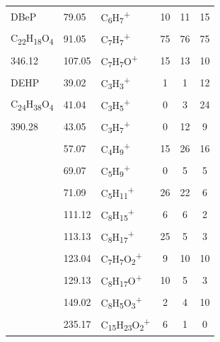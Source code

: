 {\begin{longtable}[c]{lllccc}
\hline
DBeP      & 79.05                & C\textsubscript{6}H\textsubscript{7}\textsuperscript{+}                           & 10           & 11           & 15           \\
C\textsubscript{22}H\textsubscript{18}O\textsubscript{4}          & 91.05                & C\textsubscript{7}H\textsubscript{7}\textsuperscript{+}                           & 75           & 76           & 75           \\
346.12          & 107.05               & C\textsubscript{7}H\textsubscript{7}O\textsuperscript{+}                          & 15           & 13           & 10          \\
\hline
DEHP  & 39.02  & C\textsubscript{3}H\textsubscript{3}\textsuperscript{+}                     & 1  & 1  & 12 \\
C\textsubscript{24}H\textsubscript{38}O\textsubscript{4}  & 41.04  & C\textsubscript{3}H\textsubscript{5}\textsuperscript{+}                     & 0  & 3  & 24 \\
390.28  & 43.05  & C\textsubscript{3}H\textsubscript{7}\textsuperscript{+}                     & 0  & 12 & 9  \\
 & 57.07  & C\textsubscript{4}H\textsubscript{9}\textsuperscript{+}                     & 15 & 26 & 16 \\
 & 69.07  & C\textsubscript{5}H\textsubscript{9}\textsuperscript{+}                     & 0  & 5  & 5  \\
 & 71.09  & C\textsubscript{5}H\textsubscript{11}\textsuperscript{+}                    & 26 & 22 & 6  \\
 & 111.12 & C\textsubscript{8}H\textsubscript{15}\textsuperscript{+}                    & 6  & 6  & 2  \\
 & 113.13 & C\textsubscript{8}H\textsubscript{17}\textsuperscript{+}                    & 25 & 5  & 3  \\
 & 123.04 & C\textsubscript{7}H\textsubscript{7}O\textsubscript{2}\textsuperscript{+}   & 9  & 10 & 10 \\
 & 129.13 & C\textsubscript{8}H\textsubscript{17}O\textsuperscript{+}                   & 10 & 5  & 3  \\
 & 149.02 & C\textsubscript{8}H\textsubscript{5}O\textsubscript{3}\textsuperscript{+}   & 2  & 4  & 10 \\
 & 235.17 & C\textsubscript{15}H\textsubscript{23}O\textsubscript{2}\textsuperscript{+} & 6  & 1  & 0  \\
\hline
\end{longtable}  

} %




